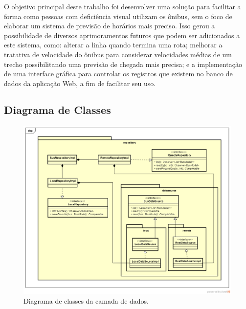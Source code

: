 \documentclass[
	12pt,				%
	oneside,			%
	a4paper,			%
	brazil				%
]{abntex2}
\begin{document}
O objetivo principal deste trabalho foi desenvolver uma solução para facilitar a forma como pessoas com deficiência visual utilizam os ônibus, sem o foco de elaborar um sistema de previsão de horários mais preciso. Isso gerou a possibilidade de diversos aprimoramentos futuros que podem ser adicionados a este sistema, como: alterar a linha quando termina uma rota; melhorar a tratativa de velocidade do ônibus para considerar velocidades médias de um trecho possibilitando uma previsão de chegada mais precisa; e a implementação de uma interface gráfica para controlar os registros que existem no banco de dados da aplicação Web, a fim de facilitar seu uso.

\postextual



\begin{apendicesenv}
\partapendices

\chapter{Diagrama de Classes}

\begin{figure}[H]
\centering
\includegraphics[width=15cm, center]{images/data-layer}
\caption{Diagrama de classes da camada de dados.}
\label{Rotulo}
\end{figure}


\end{apendicesenv}
\end{document}
